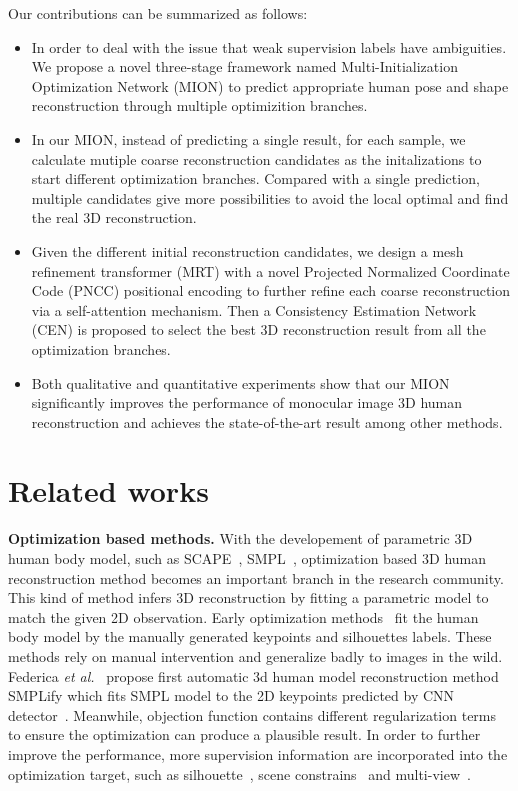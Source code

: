 \documentclass[sigconf]{acmart}
\begin{document}
Our contributions can be summarized as follows:
\begin{itemize}
	\item In order to deal with the issue that weak supervision labels have ambiguities. 
	We propose a novel three-stage framework named Multi-Initialization Optimization Network (MION) to 
	predict appropriate human pose and shape reconstruction through multiple optimizition branches.
	\item In our MION, instead of predicting a single result, for each sample, 
	we calculate mutiple coarse reconstruction candidates as the initalizations to start different optimization branches. Compared with a single prediction, multiple candidates give more possibilities to avoid the local optimal and find the real 3D reconstruction.
	
	\item Given the different initial reconstruction candidates, we design a mesh refinement 
	transformer (MRT) with a novel Projected Normalized Coordinate Code (PNCC) positional encoding 
	to further refine each coarse reconstruction via a self-attention mechanism. 
	Then a Consistency Estimation Network (CEN) is proposed to select the best 3D reconstruction result 
	from all the optimization branches.
	
	\item Both qualitative and quantitative experiments show that our MION significantly improves 
	the performance of monocular image 3D human reconstruction and achieves the state-of-the-art result among 
	other methods.  
	
\end{itemize}




\section{Related works}
\textbf{Optimization based methods. }
With the developement  of parametric 3D human body model, such as SCAPE~\cite{anguelov2005scape}, SMPL~\cite{loper2015smpl}, optimization based 3D 
human reconstruction method becomes an important branch in the research community. This kind of method infers 3D reconstruction by 
fitting a parametric model to match the given 2D observation. Early optimization methods~\cite{agarwal2005recovering, sigal2007combined} 
fit the human body model by the manually generated keypoints and silhouettes labels. These methods rely on manual 
intervention and generalize badly to images in the wild. Federica \textit{et al.}~\cite{bogo2016keep} propose 
first automatic 3d human model 
reconstruction method SMPLify which fits SMPL model to the 2D keypoints predicted by CNN detector~\cite{pishchulin2016deepcut}. 
Meanwhile, objection function contains different regularization terms to ensure the optimization can produce a plausible result. 
In order to further improve the performance, more supervision information are incorporated into the optimization target, such as silhouette~\cite{lassner2017unite}, scene constrains~\cite{zanfir2018monocular} and multi-view~\cite{huang2017towards}. 
\end{document}
